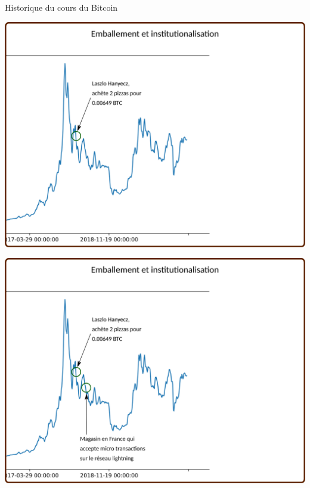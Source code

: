\documentclass[presentation]{beamer}
\begin{document}
\begin{frame}[label={sec:org6ff9387}]{Historique du cours du Bitcoin}
\begin{block}{}
\begin{center}
\includegraphics[width=.95\textwidth]{./Pictures/Timeline/80emballement_pizza.png}
\end{center}
\end{block}

\begin{block}{}
\begin{center}
\includegraphics[width=.95\textwidth]{./Pictures/Timeline/81emballement_magasin.png}
\end{center}
\end{block}


\end{frame}
\end{document}
